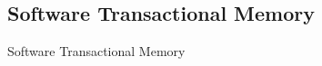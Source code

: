 \subsection{Software Transactional Memory}
Software Transactional Memory~\cite{Shavit1995STM}











